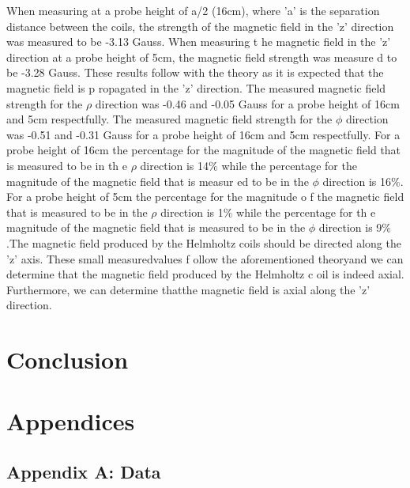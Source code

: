 \documentclass[a4paper]{article}
\begin{document}
\qq When measuring at a probe height of a/2 (16cm), where 'a' is the separation
distance between the coils, the strength of the magnetic field in the 'z'
direction was measured to be -3.13 Gauss. When measuring t he magnetic field in
the 'z' direction at a probe height of 5cm, the magnetic field strength was
measure d to be -3.28 Gauss. These results follow with the theory as it is
expected that the magnetic field is p ropagated in the 'z' direction. The
measured magnetic field strength for the $\rho$ direction was -0.46 and -0.05
Gauss for a probe height of 16cm and 5cm respectfully. The measured magnetic
field strength for the $\phi$ direction was -0.51 and -0.31 Gauss for a probe
height of 16cm and 5cm respectfully. For a probe height of 16cm the percentage
for the magnitude of the magnetic field that is measured to be in th e $\rho$
direction is 14$\%$ while the percentage for the magnitude of the magnetic field
that is measur ed to be in the $\phi$ direction is 16$\%$. For a probe height of
5cm the percentage for the magnitude o f the magnetic field that is measured to
be in the $\rho$ direction is 1$\%$ while the percentage for th e magnitude of
the magnetic field that is measured to be in the $\phi$ direction is 9$\%$.The
magnetic field produced by the Helmholtz coils should be directed along the 'z'
axis. These small measuredvalues f ollow the aforementioned theoryand we can
determine that the magnetic field produced by the Helmholtz c oil is indeed
axial. Furthermore, we can determine thatthe magnetic field is axial along the
'z' direction.


\section{Conclusion}
\qq 

\section{Appendices}

\subsection{Appendix A: Data}
\end{document}
